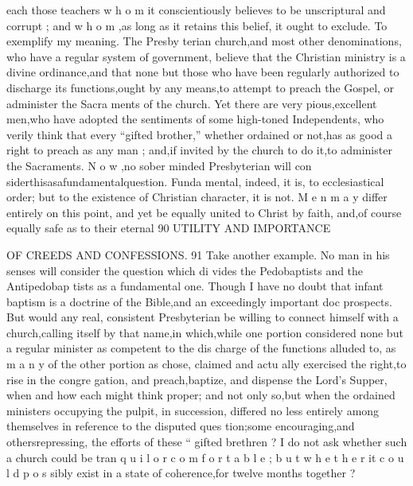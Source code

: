 \documentclass[
]{book}
\begin{document}
each those teachers w h o m it conscientiously
believes to be unscriptural and corrupt ; and
w h o m ,as long as it retains this belief, it ought to exclude.
To exemplify my meaning. The Presby terian church,and most other denominations, who have a regular system of government, believe that the Christian ministry is a divine ordinance,and that none but those who have
been regularly authorized to discharge its functions,ought by any means,to attempt to preach the Gospel, or administer the Sacra ments of the church. Yet there are very pious,excellent men,who have adopted the sentiments of some high-toned Independents, who verily think that every ``gifted brother,'' whether ordained or not,has as good a right to preach as any man ; and,if invited by the church to do it,to administer the Sacraments. N o w ,no sober minded Presbyterian will con siderthisasafundamentalquestion. Funda mental, indeed, it is, to ecclesiastical order; but to the existence of Christian character, it is not. M e n m a y differ entirely on this point, and yet be equally united to Christ by faith, and,of course equally safe as to their eternal
90 UTILITY AND IMPORTANCE

OF CREEDS AND CONFESSIONS. 91
Take another example. No man in his senses will consider the question which di vides the Pedobaptists and the Antipedobap tists as a fundamental one. Though I have no doubt that infant baptism is a doctrine of the Bible,and an exceedingly important doc
prospects. But would any real, consistent Presbyterian be willing to connect himself with a church,calling itself by that name,in which,while one portion considered none but a regular minister as competent to the dis charge of the functions alluded to, as m a n y of
the other portion as chose, claimed and actu ally exercised the right,to rise in the congre
gation, and preach,baptize, and dispense the Lord's Supper, when and how each might think proper; and not only so,but when the
ordained ministers occupying the pulpit, in succession, differed no less entirely among themselves in reference to the disputed ques
tion;some encouraging,and othersrepressing, the efforts of these `` gifted brethren ? I do not ask whether such a church could be tran
q u i l o r c o m f o r t a b l e ; b u t w h e t h e r it c o u l d p o s sibly exist in a state of coherence,for twelve months together ?
\end{document}
